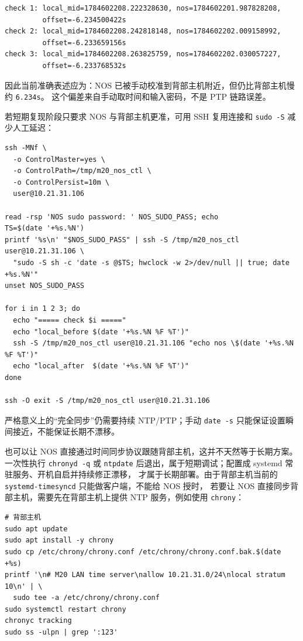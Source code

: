 \documentclass[UTF8,11pt,a4paper]{ctexart}
\begin{document}
\begin{verbatim}
check 1: local_mid=1784602208.222328630, nos=1784602201.987828208,
         offset=-6.234500422s
check 2: local_mid=1784602208.242818148, nos=1784602202.009158992,
         offset=-6.233659156s
check 3: local_mid=1784602208.263825759, nos=1784602202.030057227,
         offset=-6.233768532s
\end{verbatim}

因此当前准确表述应为：NOS 已被手动校准到背部主机附近，但仍比背部主机慢约 \texttt{6.234s}。
这个偏差来自手动取时间和输入密码，不是 PTP 链路误差。

若短期复现阶段只要求 NOS 与背部主机更准，可用 SSH 复用连接和 \texttt{sudo -S} 减少人工延迟：

\begin{verbatim}
ssh -MNf \
  -o ControlMaster=yes \
  -o ControlPath=/tmp/m20_nos_ctl \
  -o ControlPersist=10m \
  user@10.21.31.106

read -rsp 'NOS sudo password: ' NOS_SUDO_PASS; echo
TS=$(date '+%s.%N')
printf '%s\n' "$NOS_SUDO_PASS" | ssh -S /tmp/m20_nos_ctl user@10.21.31.106 \
  "sudo -S sh -c 'date -s @$TS; hwclock -w 2>/dev/null || true; date +%s.%N'"
unset NOS_SUDO_PASS

for i in 1 2 3; do
  echo "===== check $i ====="
  echo "local_before $(date '+%s.%N %F %T')"
  ssh -S /tmp/m20_nos_ctl user@10.21.31.106 "echo nos \$(date '+%s.%N %F %T')"
  echo "local_after  $(date '+%s.%N %F %T')"
done

ssh -O exit -S /tmp/m20_nos_ctl user@10.21.31.106
\end{verbatim}

严格意义上的“完全同步”仍需要持续 NTP/PTP；手动 \texttt{date -s} 只能保证设置瞬间接近，不能保证长期不漂移。

也可以让 NOS 直接通过时间同步协议跟随背部主机，这并不天然等于长期方案。一次性执行
\texttt{chronyd -q} 或 \texttt{ntpdate} 后退出，属于短期调试；配置成 systemd 常驻服务、开机自启并持续修正漂移，
才属于长期部署。由于背部主机当前的 \texttt{systemd-timesyncd} 只能做客户端，不能给 NOS 授时，
若要让 NOS 直接同步背部主机，需要先在背部主机上提供 NTP 服务，例如使用 \texttt{chrony}：

\begin{verbatim}
# 背部主机
sudo apt update
sudo apt install -y chrony
sudo cp /etc/chrony/chrony.conf /etc/chrony/chrony.conf.bak.$(date +%s)
printf '\n# M20 LAN time server\nallow 10.21.31.0/24\nlocal stratum 10\n' | \
  sudo tee -a /etc/chrony/chrony.conf
sudo systemctl restart chrony
chronyc tracking
sudo ss -ulpn | grep ':123'
\end{verbatim}
\end{document}
